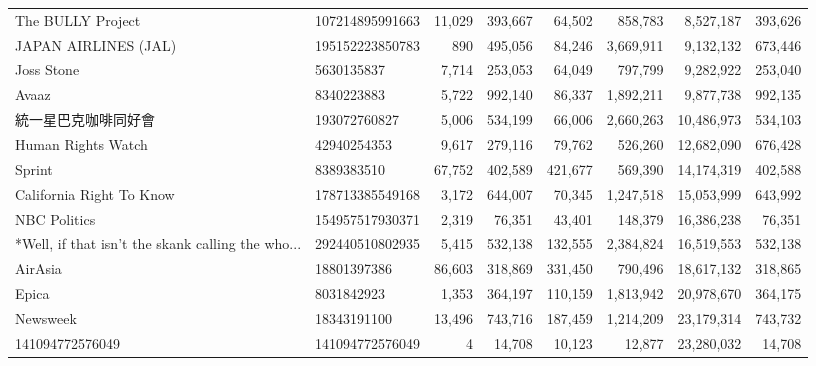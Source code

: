 \begin{longtable}{llrrrrrr}
                                 The BULLY Project &  107214895991663 &  11,029 &     393,667 &     64,502 &     858,783 &     8,527,187 &    393,626 \\
                              JAPAN AIRLINES (JAL) &  195152223850783 &     890 &     495,056 &     84,246 &   3,669,911 &     9,132,132 &    673,446 \\
                                        Joss Stone &       5630135837 &   7,714 &     253,053 &     64,049 &     797,799 &     9,282,922 &    253,040 \\
                                             Avaaz &       8340223883 &   5,722 &     992,140 &     86,337 &   1,892,211 &     9,877,738 &    992,135 \\
                                        統一星巴克咖啡同好會 &     193072760827 &   5,006 &     534,199 &     66,006 &   2,660,263 &    10,486,973 &    534,103 \\
                                Human Rights Watch &      42940254353 &   9,617 &     279,116 &     79,762 &     526,260 &    12,682,090 &    676,428 \\
                                            Sprint &       8389383510 &  67,752 &     402,589 &    421,677 &     569,390 &    14,174,319 &    402,588 \\
                          California Right To Know &  178713385549168 &   3,172 &     644,007 &     70,345 &   1,247,518 &    15,053,999 &    643,992 \\
                                      NBC Politics &  154957517930371 &   2,319 &      76,351 &     43,401 &     148,379 &    16,386,238 &     76,351 \\
 *Well, if that isn't the skank calling the who... &  292440510802935 &   5,415 &     532,138 &    132,555 &   2,384,824 &    16,519,553 &    532,138 \\
                                           AirAsia &      18801397386 &  86,603 &     318,869 &    331,450 &     790,496 &    18,617,132 &    318,865 \\
                                             Epica &       8031842923 &   1,353 &     364,197 &    110,159 &   1,813,942 &    20,978,670 &    364,175 \\
                                          Newsweek &      18343191100 &  13,496 &     743,716 &    187,459 &   1,214,209 &    23,179,314 &    743,732 \\
                                   141094772576049 &  141094772576049 &       4 &      14,708 &     10,123 &      12,877 &    23,280,032 &     14,708 \\

\end{longtable}
